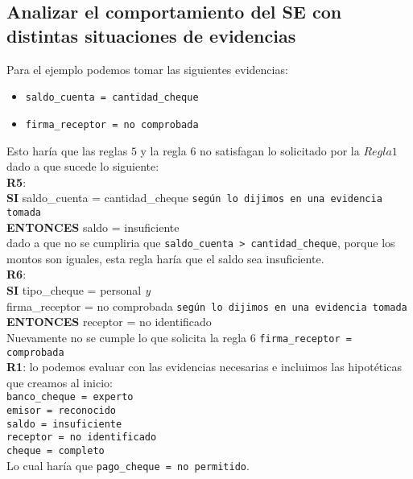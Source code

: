 \documentclass{article}
\begin{document}
\subsection{Analizar el comportamiento del SE con distintas situaciones de
evidencias}
Para el ejemplo podemos tomar las siguientes evidencias:
\begin{itemize}
	\item \texttt{saldo\_cuenta = cantidad\_cheque}
	\item \texttt{firma\_receptor = no comprobada}
\end{itemize}

Esto haría que las reglas $5$ y la regla $6$ no satisfagan lo solicitado por la
$Regla 1$ dado a que sucede lo siguiente:
\\

\textbf{R5}:\\
	\textbf{SI}
	saldo\_cuenta =  cantidad\_cheque \texttt{según lo dijimos en una
	evidencia tomada} \\
	\textbf{ENTONCES}	saldo = insuficiente\\

dado a que no se cumpliria que \texttt{saldo\_cuenta \textgreater
cantidad\_cheque}, porque los montos son iguales, esta regla haría que el saldo
sea insuficiente.\\

\textbf{R6}:\\
	\textbf{SI}
	tipo\_cheque = personal \textit{y}\\
	firma\_receptor = no comprobada \texttt{según lo dijimos en una
	evidencia tomada}\\
	\textbf{ENTONCES}	receptor = no identificado\\

Nuevamente no se cumple lo que solicita la regla 6 \texttt{firma\_receptor = comprobada}
\\

\textbf{R1}: lo podemos evaluar con las evidencias necesarias e incluimos las
hipotéticas que creamos al inicio:\\
	\texttt{banco\_cheque = experto}\\
	\texttt{emisor = reconocido}\\
	\texttt{saldo = insuficiente}\\
	\texttt{receptor = no identificado}\\
	\texttt{cheque = completo} \\

Lo cual haría que \texttt{pago\_cheque = no permitido}.
\end{document}
